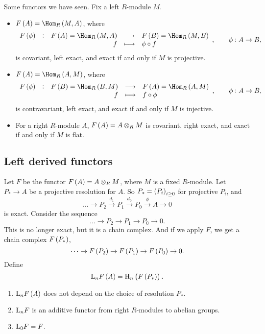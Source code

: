 \begin{example*}
Some functors we have seen. Fix a left $ R $-module $ M $.
\begin{itemize}
\item $ F\br{A} = \Hom_R\br{M, A} $, where
$$ \function[F\br{\phi}]{F\br{A} = \Hom_R\br{M, A}}{F\br{B} = \Hom_R\br{M, B}}{f}{\phi \circ f}, \qquad \phi : A \to B, $$
is covariant, left exact, and exact if and only if $ M $ is projective.
\item $ F\br{A} = \Hom_R\br{A, M} $, where
$$ \function[F\br{\phi}]{F\br{B} = \Hom_R\br{B, M}}{F\br{A} = \Hom_R\br{A, M}}{f}{f \circ \phi}, \qquad \phi : A \to B, $$
is contravariant, left exact, and exact if and only if $ M $ is injective.
\item For a right $ R $-module $ A $, $ F\br{A} = A \otimes_R M $ is covariant, right exact, and exact if and only if $ M $ is flat.
\end{itemize}
\end{example*}

\pagebreak

\subsection{Left derived functors}

Let $ F $ be the functor $ F\br{A} = A \otimes_R M $, where $ M $ is a fixed $ R $-module. Let $ P_* \to A $ be a projective resolution for $ A $. So $ P_* = \br{P_i}_{i \ge 0} $ for projective $ P_i $, and
$$ \dots \to P_2 \xrightarrow{d_1} P_1 \xrightarrow{d_0} P_0 \xrightarrow{\phi} A \to 0 $$
is exact. Consider the sequence
$$ \dots \to P_2 \to P_1 \to P_0 \to 0. $$
This is no longer exact, but it is a chain complex. And if we apply $ F $, we get a chain complex $ F\br{P_*} $,
$$ \dots \to F\br{P_2} \to F\br{P_1} \to F\br{P_0} \to 0. $$
Define
$$ \L_nF\br{A} = \H_n\br{F\br{P_*}}. $$

\begin{theorem}
\hfill
\begin{enumerate}
\item $ \L_nF\br{A} $ does not depend on the choice of resolution $ P_* $.
\item $ \mathrm{L}_nF $ is an additive functor from right $ R $-modules to abelian groups.
\item $ \mathrm{L}_0F = F $.
\end{enumerate}
\end{theorem}

